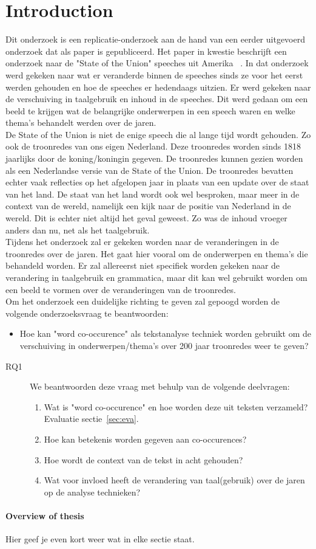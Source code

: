 \section{Introduction}
\label{sec:intro}

Dit onderzoek is een replicatie-onderzoek aan de hand van een eerder uitgevoerd onderzoek dat als paper is gepubliceerd. Het paper in kwestie beschrijft een onderzoek naar de "State of the Union" speeches uit Amerika ~\cite{state}. In dat onderzoek werd gekeken naar wat er veranderde binnen de speeches sinds ze voor het eerst werden gehouden en hoe de speeches er hedendaags uitzien. Er werd gekeken naar de verschuiving in taalgebruik en inhoud in de speeches. Dit werd gedaan om een beeld te krijgen wat de belangrijke onderwerpen in een speech waren en welke thema's behandelt werden over de jaren.
\\
De State of the Union is niet de enige speech die al lange tijd wordt gehouden. Zo ook de troonredes van ons eigen Nederland. Deze troonredes worden sinds 1818 jaarlijks door de koning/koningin gegeven. De troonredes kunnen gezien worden als een Nederlandse versie van de State of the Union. De troonredes bevatten echter vaak reflecties op het afgelopen jaar in plaats van een update over de staat van het land. De staat van het land wordt ook wel besproken, maar meer in de context van de wereld, namelijk een kijk naar de positie van Nederland in de wereld. Dit is echter niet altijd het geval geweest. Zo was de inhoud vroeger anders dan nu, net als het taalgebruik.
\\
Tijdens het onderzoek zal er gekeken worden naar de veranderingen in de troonredes over de jaren. Het gaat hier vooral om de onderwerpen en thema's die behandeld worden. Er zal allereerst niet specifiek worden gekeken naar de verandering in taalgebruik en grammatica, maar dit kan wel gebruikt worden om een beeld te vormen over de veranderingen van de troonredes.
\\
Om het onderzoek een duidelijke richting te geven zal gepoogd worden de volgende onderzoeksvraag te beantwoorden:

\begin{itemize}
\item Hoe kan "word co-occurence" als tekstanalyse techniek worden gebruikt om de verschuiving in onderwerpen/thema's over 200 jaar troonredes weer te geven?
\end{itemize}

\begin{description}
\item[RQ1]  We   beantwoorden deze vraag met behulp van de volgende deelvragen:
\begin{enumerate}
\item Wat is "word co-occurence" en hoe worden deze uit teksten verzameld? Evaluatie sectie~\ref{sec:eva}.
\item Hoe kan betekenis worden gegeven aan co-occurences?
\item Hoe wordt de context van de tekst in acht gehouden?
\item Wat voor invloed heeft de verandering van taal(gebruik) over de jaren op de analyse technieken?
\end{enumerate}
\end{description}


\paragraph{Overview of thesis}
Hier geef je even kort weer wat in elke sectie staat.